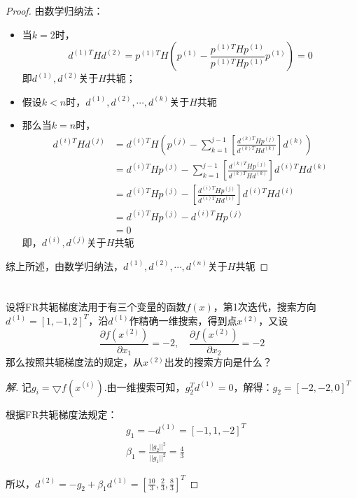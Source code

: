 \documentclass[a4paper,12pt]{article}
\begin{document}
\begin{proof}
	由数学归纳法：
\begin{itemize}
	\item 

    当$k=2$时，
    \begin{equation}
    d^{(1)T}Hd^{(2)}=p^{(1)T}H\left(p^{(1)}-\frac{p^{(1)T}Hp^{(1)}}{p^{(1)T}Hp^{(1)}}p^{(1)}\right)=0
    \end{equation}
    即$d^{(1)},d^{(2)}$关于$H$共轭；
    
    \item  假设$k<n$时，$d^{(1)},d^{(2)},\cdots,d^{(k)}$关于$H$共轭
    
    \item 那么当$k=n$时，
    \begin{equation}
    \begin{aligned}
    d^{(i)T}Hd^{(j)}&=d^{(i)T}H\left(p^{(j)}-\sum_{k=1}^{j-1}\left[\frac{d^{(k)T}Hp^{(j)}}{d^{(k)T}Hd^{(k)}}\right]d^{(k)}\right) \\
    &=d^{(i)T}Hp^{(j)}-\sum_{k=1}^{j-1}\left[\frac{d^{(k)T}Hp^{(j)}}{d^{(k)T}Hd^{(k)}}\right]d^{(i)T}Hd^{(k)} \\
    &=d^{(i)T}Hp^{(j)}-\left[\frac{d^{(i)T}Hp^{(j)}}{d^{(i)T}Hd^{(i)}}\right]d^{(i)T}Hd^{(i)} \\
    &= d^{(i)T}Hp^{(j)}-d^{(i)T}Hp^{(j)} \\
    &=0
    \end{aligned}
    \end{equation}
    即，$d^{(i)},d^{(j)}$关于$H$共轭
\end{itemize}
    综上所述，由数学归纳法，$d^{(1)},d^{(2)},\cdots,d^{(n)}$关于$H$共轭
\end{proof}

\newpage
\section{}
设将FR共轭梯度法用于有三个变量的函数$f(x)$，第1次迭代，搜索方向$d^{(1)}=[1,-1,2]^T$，沿$d^{(1)}$作精确一维搜索，得到点$x^{(2)}$，又设
\begin{equation}
\frac{\partial f(x^{(2)})}{\partial x_1}=-2,\quad \frac{\partial f(x^{(2)})}{\partial x_2}=-2
\end{equation}
那么按照共轭梯度法的规定，从$x^{(2)}$出发的搜索方向是什么？

\begin{proof}[解]
	记$g_i=\bigtriangledown f(x^{(i)})$.由一维搜索可知，$g_2^Td^{(1)}=0$，解得：$g_2=[-2,-2,0]^T$
	
	根据FR共轭梯度法规定：
	\begin{equation}
	\begin{aligned}
	&g_1=-d^{(1)}=[-1,1,-2]^T \\
	&\beta_1=\frac{||g_2||^2}{||g_1||^2}=\frac{4}{3}
	\end{aligned}
	\end{equation}
	
	所以，$d^{(2)}=-g_2+\beta_1 d^{(1)}=[\frac{10}{3},\frac{2}{3},\frac{8}{3}]^T$
\end{proof}
\end{document}
